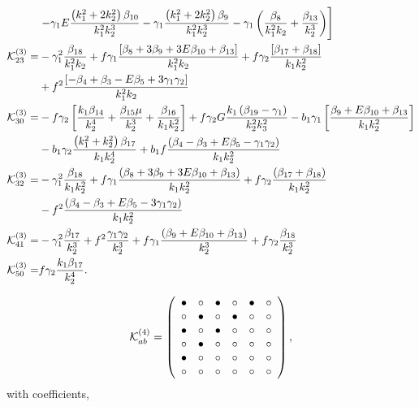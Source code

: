 \begin{align*}
&\left. - \gamma_1 E \frac{\left( k_1^2 + 2 k_2^2\right) \beta_{10} }{k_1^2 k_2^3} - \gamma_1 \frac{\left(k_1^2 + 2 k_2^2 \right) \beta_{9}}{k_1^2 k_2^3} - \gamma_1 \left( \frac{\beta_{8}}{k_1^2 k_2} + \frac{\beta_{13}}{k_2^3} \right) \right]\\
\ko_{23}^{(3)}=& -\gamma_1^2 \frac{\beta_{18}}{k_1^2 k_2} + f \gamma_1 \frac{\left[ \beta_{8} + 3 \beta_{9} + 3 E \beta_{10} + \beta_{13}\right]}{k_1^2 k_2} + f \gamma_2 \frac{\left[ \beta_{17} + \beta_{18}\right]}{k_1 k_2^2} \\
&+ f^2 \frac{\left[ -{\beta_{4}+\beta_{3}} - E \beta_{5} + 3 \gamma_1 \gamma_2 \right]}{k_1^2 k_2}\\
%
\ko_{30}^{(3)}=& -f \gamma_2 \left[ \frac{k_1 \beta_{14}}{k_2^4} + \frac{\beta_{15} \mu}{k_2^3} + \frac{\beta_{16}}{k_1 k_2^2} \right] + f \gamma_2 G \frac{k_1 \left(\beta_{19} - \gamma_1 \right)}{k_2^2 k_3^2} - b_1 \gamma_1 \left[ \frac{\beta_{9} + E \beta_{10} + \beta_{13}}{k_1 k_2^2}  \right] \\
&- b_1 \gamma_2 \frac{\left(k_1^2 + k_2^2\right) \beta_{17} }{k_1 k_2^4} + b_1 f \frac{\left({\beta_{4}-\beta_{3}} + E \beta_{5} - \gamma_1 \gamma_2 \right)}{k_1 k_2^2}\\
%
\ko_{32}^{(3)}=& - \gamma_1^2 \frac{\beta_{18}}{k_1 k_2^2} + f \gamma_1 \frac{\left(\beta_{8} + 3 \beta_{9} + 3 E \beta_{10} + \beta_{13} \right)}{k_1 k_2^2} + f \gamma_2 \frac{\left(\beta_{17} + \beta_{18} \right)}{k_1 k_2^2} \\
&- f^2 \frac{\left({\beta_{4}-\beta_{3}} + E \beta_{5} - 3 \gamma_1 \gamma_2 \right)}{k_1 k_2^2}\\
%
\ko_{41}^{(3)}=& - \gamma_1^2 \frac{\beta_{17}}{k_2^3} + f^2 \frac{\gamma_1 \gamma_2}{k_2^3} + f \gamma_1 \frac{\left(\beta_{9} + E \beta_{10} + \beta_{13} \right)}{k_2^3} + f \gamma_2 \frac{\beta_{18}}{k_2^3}\\
\ko_{50}^{(3)}=& f \gamma_2 \frac{k_1 \beta_{17}}{k_2^4}.
\end{align*}

\begin{equation}
	\mathcal{K}^{(4)}_{ab}= 
 \left( \begin {array}{cccccc} \bullet &\circ &\bullet &\circ 
&\bullet &\circ \\  \circ &\bullet &\circ &
\bullet &\circ &\circ \\  \bullet &\circ &
\bullet &\circ &\circ &\circ \\  \circ &
\bullet &\circ &\circ &\circ &\circ \\  
\bullet &\circ &\circ &\circ &\circ &\circ 
\\  \circ &\circ &\circ &\circ &\circ &
\circ \end {array} \right), 
\end{equation}
with coefficients, 

